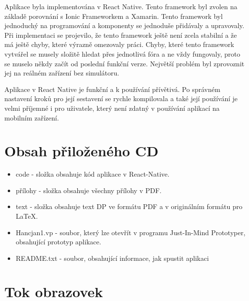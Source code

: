 \documentclass[11pt,twoside,a4paper]{book}
\begin{document}
Aplikace byla implementována v React Native. Tento framework byl zvolen na základě porovnání s Ionic Frameworkem a Xamarin. Tento framework byl jednoduchý na programování a komponenty se jednoduše přidávaly a upravovaly. Při implementaci se projevilo, že tento framework ještě není zcela stabilní a že má ještě chyby, které výrazně omezovaly práci. Chyby, které tento framework vytvářel se musely složitě hledat přes jednotlivá fóra a ne vždy fungovaly, proto se muselo někdy začít od poslední funkční verze. Největší problém byl zprovoznit jej na reálném zařízení bez simulátoru. 

Aplikace v React Native je funkční a k používání přívětivá. Po správném nastavení kroků pro její sestavení se rychle kompilovala a také její používání je velmi příjemné i pro uživatele, který není zdatný v používání aplikací na mobilním zařízení.


%





%

\appendix

\printnomenclature
\label{apx:zkratky}

\chapter{Obsah přiloženého CD}

\begin{itemize}
	\item code - složka obsahuje kód aplikace v React-Native.
	\item přílohy - složka obsahuje všechny přílohy v PDF.
	\item text - složka obsahuje text DP ve formátu PDF a v originálním formátu pro LaTeX.
	\item Hancjan1.vp - soubor, který lze otevřít v programu Just-In-Mind Prototyper, obsahující prototyp aplikace.
	\item README.txt - soubor, obsahující informace, jak spustit aplikaci
\end{itemize}

\chapter{Tok obrazovek}


\end{document}
